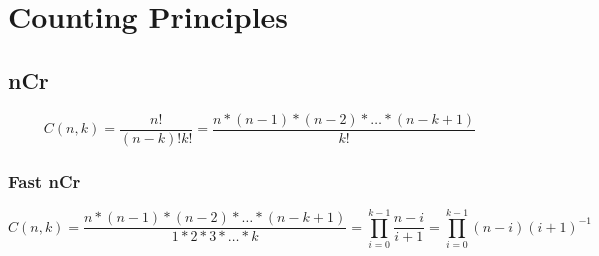 \section{Counting Principles}
	\subsection{nCr}
		\[
		C(n,k) = \dfrac{n!}{(n-k)!k!} = \dfrac{n*(n-1)*(n-2)*\ldots*(n-k+1)}{k!}
		\]
	
		\subsubsection{Fast nCr}
			\[
			C(n,k) = \dfrac{n*(n-1)*(n-2)*\ldots*(n-k+1)}{1*2*3*\ldots*k} = \prod\limits_{i=0}^{k-1} \dfrac{n-i}{i+1} = \prod\limits_{i=0}^{k-1} (n-i)(i+1)^{-1}
			\]
			
